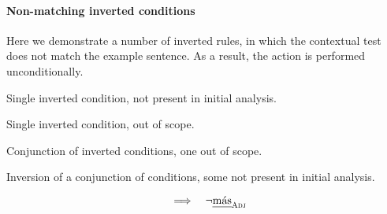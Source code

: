 \paragraph{Non-matching inverted conditions}

Here we demonstrate a number of inverted rules, in which the contextual test does not match the example sentence. As a result, the action is performed unconditionally.

 Single inverted condition, not present in initial analysis.

 Single inverted condition, out of scope.

 Conjunction of inverted conditions, one out of scope.

 Inversion of a conjunction of conditions, some not present in initial analysis.

\begin{equation}
 \quad\Longrightarrow\quad \neg{}\text{\em m\'{a}s}_{\text{\sc Adj}} 
\end{equation}







